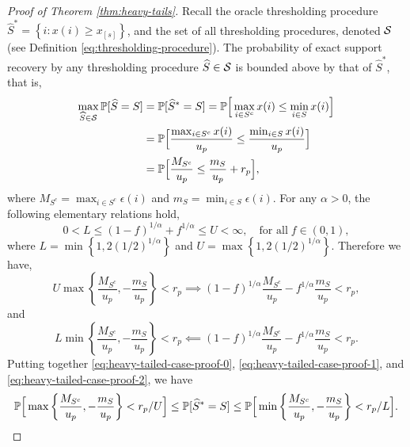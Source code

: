 \begin{proof}[Proof of Theorem \ref{thm:heavy-tails}]
Recall the oracle thresholding procedure $\widehat{S}^* = \left\{i:x(i) \ge x_{[s]}\right\}$, and the set of all thresholding procedures, denoted 
${\cal S}$ (see Definition \ref{eq:thresholding-procedure}).
The probability of exact support recovery by any thresholding procedure $\widehat{S}\in{\cal S}$ is bounded above by that of $\widehat{S}^*$, that is,
\begin{align}
    \max_{\widehat{S}\in{\cal S}}\P[\widehat{S}=S] 
        &= \P[\widehat{S}^*=S] 
        = \P\Big[\max_{i\in S^c}x(i) \le \min_{i\in S}x(i)\Big] \nonumber \\
        &= \P\Big[\frac{\max_{i\in S^c}x(i)}{u_p} \le \frac{\min_{i\in S}x(i)}{u_p}\Big] \nonumber \\
        &= \P\Big[\frac{M_{S^c}}{u_p} \le \frac{m_S}{u_p} + r_p\Big], \label{eq:heavy-tailed-case-proof-0}
\end{align}
where $M_{S^c} = \max_{i\in S^c}\epsilon(i)$ and $m_S = \min_{i\in S}\epsilon(i)$.
For any $\alpha > 0$, the following elementary relations hold,
\begin{equation*}
    0 < L \le (1-f)^{1/\alpha} + f^{1/\alpha} \le U < \infty, \quad \text{for all} \; f\in(0,1),
\end{equation*}
where $L = \min\left\{1, 2(1/2)^{1/\alpha}\right\}$ and $U = \max\left\{1, 2(1/2)^{1/\alpha}\right\}$.
Therefore we have,
\begin{equation} \label{eq:heavy-tailed-case-proof-1}
    U\max\left\{\frac{M_{S^c}}{u_p}, -\frac{m_S}{u_p}\right\} < r_p
    \implies
    (1-f)^{1/\alpha}\frac{M_{S^c}}{u_p} - f^{1/\alpha}\frac{m_S}{u_p} < r_p,
\end{equation}
and 
\begin{equation} \label{eq:heavy-tailed-case-proof-2}
    L\min\left\{\frac{M_{S^c}}{u_p}, -\frac{m_S}{u_p}\right\} < r_p
    \impliedby
    (1-f)^{1/\alpha}\frac{M_{S^c}}{u_p} - f^{1/\alpha}\frac{m_S}{u_p} < r_p.
\end{equation}
Putting together \eqref{eq:heavy-tailed-case-proof-0}, \eqref{eq:heavy-tailed-case-proof-1}, and \eqref{eq:heavy-tailed-case-proof-2}, we have
\begin{equation} \label{eq:heavy-tailed-case-proof-3}
    \P\Big[\max\left\{\frac{M_{S^c}}{u_p}, -\frac{m_S}{u_p}\right\} < r_p/U\Big]
    \le \P[\widehat{S}^*=S]
    \le \P\Big[\min\left\{\frac{M_{S^c}}{u_p}, -\frac{m_S}{u_p}\right\} < r_p/L\Big].

\end{equation}
\end{proof}

